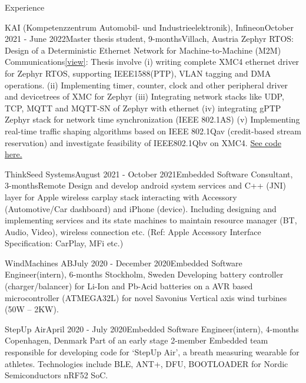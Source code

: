 \documentclass[
	a4paper, %
	11pt, %
]{resume} %
\begin{document}
\begin{rSection}{Experience}
\begin{rSubsection}{KAI (Kompetenzzentrum Automobil- und Industrieelektronik), Infineon}{October 2021 - June 2022}{Master thesis student, 9-months}{Villach, Austria}
            {\color{orange} Zephyr RTOS: Design of a Deterministic Ethernet Network for Machine-to-Machine (M2M) Communications}\href{https://www.linkedin.com/in/sebinsphilip/overlay/1635506986689/single-media-viewer/?type=DOCUMENT&profileId=ACoAAAm-xe0BCYwezV-q9pIlhl7WYDQHRff8kIE}{[view]}: Thesis involve (i) writing complete XMC4 ethernet driver for Zephyr RTOS, supporting IEEE1588(PTP), VLAN tagging and DMA operations. (ii) Implementing timer, counter, clock and other peripheral driver and devicetrees of XMC for Zephyr (iii) Integrating network stacks like UDP, TCP, MQTT and MQTT-SN of Zephyr with ethernet (iv) integrating gPTP Zephyr stack for network time synchronization (IEEE 802.1AS) (v) Implementing real-time traffic shaping algorithms based on IEEE 802.1Qav (credit-based stream reservation) and investigate feasibility of IEEE802.1Qbv on XMC4.
            \href{https://github.com/sebinsphilip/zephyr\_xmc}{ See code here.}
		
	\end{rSubsection}


	\begin{rSubsection}{ThinkSeed Systems}{August 2021 - October 2021}{Embedded Software Consultant, 3-months}{Remote}
            Design and develop android system services and C++ (JNI) layer for Apple wireless carplay stack interacting with Accessory (Automotive/Car dashboard) and iPhone (device). Including designing and implementing services and its state machines to maintain resource manager (BT, Audio, Video), wireless connection etc. (Ref: Apple Accessory Interface Specification: CarPlay, MFi etc.)

		
	\end{rSubsection}


	\begin{rSubsection}{WindMachines AB}{July 2020 - December 2020}{Embedded Software Engineer(intern), 6-months}{ Stockholm, Sweden}
            Developing battery controller (charger/balancer) for Li-Ion and Pb-Acid batteries on a AVR based microcontroller (ATMEGA32L) for novel Savonius Vertical axis wind turbines (50W – 2KW).

	\end{rSubsection}
 

	\begin{rSubsection}{StepUp Air}{April 2020 - July 2020}{Embedded Software Engineer(intern), 4-months}{ Copenhagen, Denmark}
            Part of an early stage 2-member Embedded team responsible for developing code for ‘StepUp Air’, a breath measuring wearable for athletes. Technologies include BLE, ANT+, DFU, BOOTLOADER for Nordic Semiconductors nRF52 SoC.


\end{rSubsection}
\end{rSection}
\end{document}
